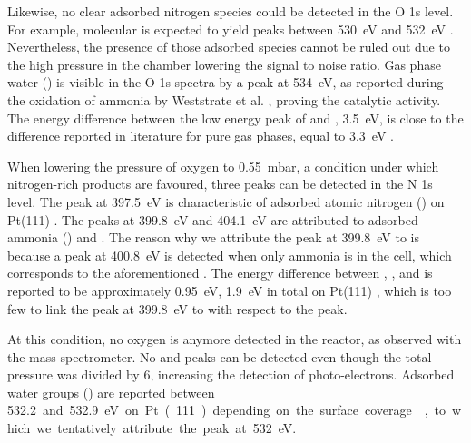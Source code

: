 Likewise, no clear adsorbed nitrogen species could be detected in the O 1s level.
For example, molecular  is expected to yield peaks between \qty{530}{\eV} and \qty{532}{\eV} \parencite{Kiskinova1984, Zhu2003, Gunther2008}.
Nevertheless, the presence of those adsorbed species cannot be ruled out due to the high pressure in the chamber lowering the signal to noise ratio.
Gas phase water () is visible in the O 1s spectra by a peak at \qty{534}{\eV}, as reported during the oxidation of ammonia by Weststrate et al. \parencite*{Weststrate2006}, proving the catalytic activity.
The energy difference between the low energy peak of  and , \qty{3.5}{\eV}, is close to the difference reported in literature for pure gas phases, equal to \qty{3.3}{\eV} \parencite{Linford2019, Avval2022}.


When lowering the pressure of oxygen to \qty{0.55}{\milli\bar}, a condition under which nitrogen-rich products are favoured, three peaks can be detected in the N 1s level.
The peak at \qty{397.5}{\eV} is characteristic of adsorbed atomic nitrogen () on Pt(111) \parencite{vandenBroek1999, Zhu2003}.
The peaks at \qty{399.8}{\eV} and \qty{404.1}{\eV} are attributed to adsorbed ammonia () and .
The reason why we attribute the peak at \qty{399.8}{\eV} to  is because a peak at \qty{400.8}{\eV} is detected when only ammonia is in the cell, which corresponds to the aforementioned .
The energy difference between , , and  is reported to be approximately \qty{0.95}{\eV}, \qty{1.9}{\eV} in total on Pt(111) \parencite{Ivashenko2021}, which is too few to link the peak at \qty{399.8}{\eV} to  with respect to the  peak.

At this condition, no oxygen is anymore detected in the reactor, as observed with the mass spectrometer.
No  and  peaks can be detected even though the total pressure was divided by \num{6}, increasing the detection of photo-electrons.
Adsorbed water groups () are reported between \qty{532.2} and \qty{532.9} eV on Pt(111) depending on the surface coverage \parencite{Fisher1980, Kiskinova1985}, to which we tentatively attribute the peak at \qty{532}{\eV}.

